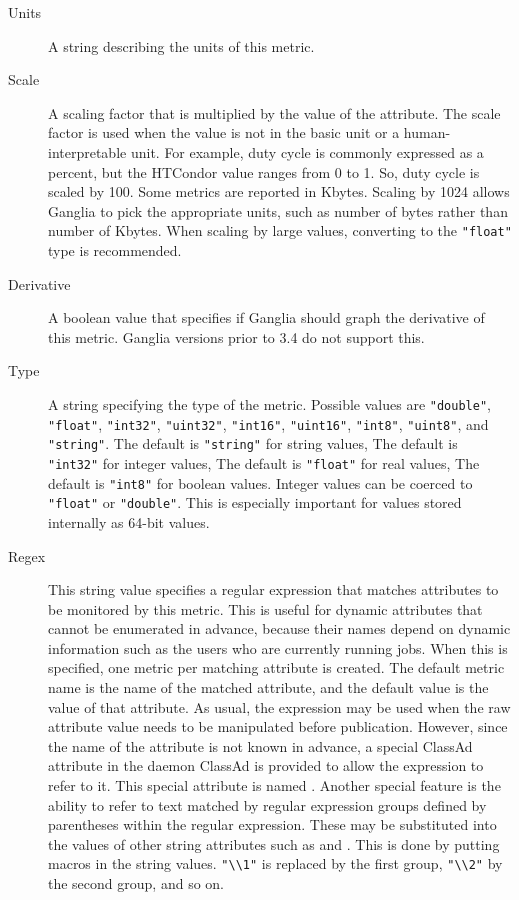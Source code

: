 \begin{description}
  \item[Units] A string describing the units of this metric.

  \item[Scale] A scaling factor that is multiplied by the value of the
     attribute.
    The scale factor is used when the value is not in the basic unit
    or a human-interpretable unit. For example, duty cycle is commonly
    expressed as a percent, but the HTCondor value ranges from 0 to 1.
    So, duty cycle is scaled by 100. Some metrics are reported in Kbytes.
    Scaling by 1024 allows Ganglia to pick the appropriate units,
    such as number of bytes rather than number of Kbytes. 
    When scaling by large values, converting to
    the \verb|"float"| type is recommended.

  \item[Derivative] A boolean value that specifies if Ganglia should
    graph the derivative of this metric.  Ganglia versions prior to
    3.4 do not support this.

  \item[Type] A string specifying the type of the metric.  Possible
    values are \verb|"double"|, \verb|"float"|, \verb|"int32"|,
    \verb|"uint32"|, \verb|"int16"|, \verb|"uint16"|,
    \verb|"int8"|, \verb|"uint8"|, and \verb|"string"|.
    The default is \verb|"string"| for string values,
    The default is \verb|"int32"| for integer values,
    The default is \verb|"float"| for real values,
    The default is \verb|"int8"| for boolean values.
    Integer values can be coerced to \verb|"float"| or \verb|"double"|.
    This is especially important for values stored internally as 64-bit
    values.

  \item[Regex] This string value specifies a regular expression that
    matches attributes to be monitored by this metric.  This is useful
    for dynamic attributes that cannot be enumerated in advance,
    because their names depend on dynamic information such as the
    users who are currently running jobs.  When this is specified, one
    metric per matching attribute is created.  The default metric name
    is the name of the matched attribute, and the default value is the
    value of that attribute.  As usual, the  expression
    may be used when the raw attribute value needs to be manipulated
    before publication.  However, since the name of the attribute is
    not known in advance, a special ClassAd attribute in the daemon ClassAd
    is provided to allow the  expression to refer to it.
    This special attribute is named .  Another special
    feature is the ability to refer to text matched by regular
    expression groups defined by parentheses within the regular
    expression.  These may be substituted into the values of other
    string attributes such as  and .  This is
    done by putting macros in the string values.  \verb|"\\1"| is
    replaced by the first group, \verb|"\\2"| by the second group, and
    so on.


\end{description}
